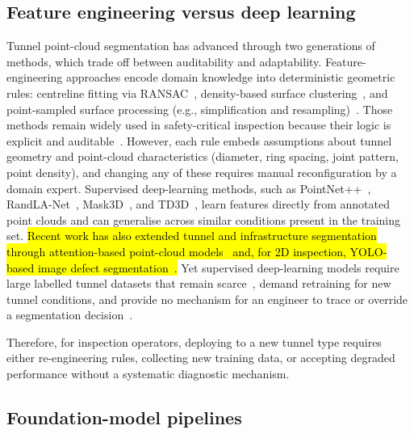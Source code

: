 \documentclass[a4paper,fleqn]{cas-dc}
\begin{document}
{\subsection{Feature engineering versus deep learning}

Tunnel point-cloud segmentation has advanced through two generations of methods, which trade off between auditability and adaptability. Feature-engineering approaches encode domain knowledge into deterministic geometric rules: centreline fitting via RANSAC~\cite{fischler1981ransac}, density-based surface clustering~\cite{ester1996dbscan}, and point-sampled surface processing (e.g., simplification and resampling)~\cite{pauly2002}. Those methods remain widely used in safety-critical inspection because their logic is explicit and auditable~\cite{weidner2024generalized}. However, each rule embeds assumptions about tunnel geometry and point-cloud characteristics (diameter, ring spacing, joint pattern, point density), and changing any of these requires manual reconfiguration by a domain expert. Supervised deep-learning methods, such as PointNet++~\cite{qi2017pointnet}, RandLA-Net~\cite{hu2020randla}, Mask3D~\cite{schult2023mask3d}, and TD3D~\cite{kolodiazhnyi2024td3d}, learn features directly from annotated point clouds and can generalise across similar conditions present in the training set. \hl{Recent work has also extended tunnel and infrastructure segmentation through attention-based point-cloud models~\cite{wang2026serialformer} and, for 2D inspection, YOLO-based image defect segmentation~\cite{yang2024yologsd, liang2026ecayolo}.} Yet supervised
deep-learning models require large labelled tunnel datasets that remain scarce~\cite{su2024review}, demand retraining for new tunnel conditions, and provide no mechanism for an engineer to trace or override a segmentation decision~\cite{cha2024deep}.

Therefore, for inspection operators, deploying to a new tunnel type requires either re-engineering rules, collecting new training data, or accepting degraded performance without a systematic diagnostic mechanism.

\subsection{Foundation-model pipelines}

}
\end{document}
